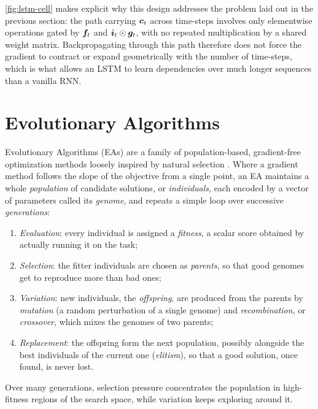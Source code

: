 \autoref{fig:lstm-cell} makes explicit why this design addresses the problem laid out in the previous section: the path carrying $\bm{c}_t$ across time-steps involves only elementwise operations gated by $\bm{f}_t$ and $\bm{i}_t \odot \bm{g}_t$, with no repeated multiplication by a shared weight matrix. Backpropagating through this path therefore does not force the gradient to contract or expand geometrically with the number of time-steps, which is what allows an LSTM to learn dependencies over much longer sequences than a vanilla RNN.

\section{Evolutionary Algorithms}
\label{sec:ea}

Evolutionary Algorithms (EAs) are a family of population-based, gradient-free optimization methods loosely inspired by natural selection \cite{eiben2015introduction}. Where a gradient method follows the slope of the objective from a single point, an EA maintains a whole \emph{population} of candidate solutions, or \emph{individuals}, each encoded by a vector of parameters called its \emph{genome}, and repeats a simple loop over successive \emph{generations}:
\begin{enumerate}
    \item \emph{Evaluation}: every individual is assigned a \emph{fitness}, a scalar score obtained by actually running it on the task;
    \item \emph{Selection}: the fitter individuals are chosen as \emph{parents}, so that good genomes get to reproduce more than bad ones;
    \item \emph{Variation}: new individuals, the \emph{offspring}, are produced from the parents by \emph{mutation} (a random perturbation of a single genome) and \emph{recombination}, or \emph{crossover}, which mixes the genomes of two parents;
    \item \emph{Replacement}: the offspring form the next population, possibly alongside the best individuals of the current one (\emph{elitism}), so that a good solution, once found, is never lost.
\end{enumerate}
Over many generations, selection pressure concentrates the population in high-fitness regions of the search space, while variation keeps exploring around it.

